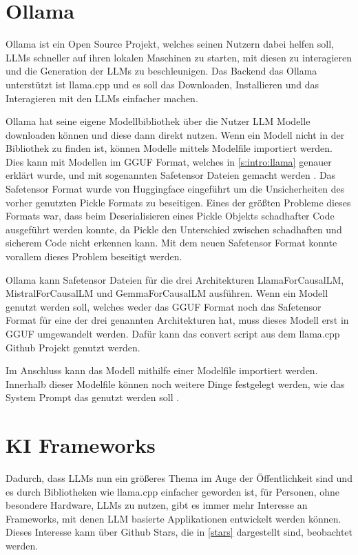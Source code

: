 \section{Ollama}
\label{s:intro:oll}
Ollama ist ein Open Source Projekt, welches seinen Nutzern dabei helfen 
soll, LLMs schneller auf ihren lokalen Maschinen 
zu starten, mit diesen zu interagieren und die Generation der LLMs zu beschleunigen. 
Das Backend das Ollama unterstützt ist llama.cpp und es soll das Downloaden, 
Installieren und das Interagieren mit den LLMs einfacher machen. \par
Ollama hat seine eigene Modellbibliothek über die Nutzer LLM Modelle 
downloaden können und diese dann direkt nutzen. 
Wenn ein Modell nicht in der Bibliothek zu finden ist, können 
Modelle mittels Modelfile importiert werden. Dies kann mit Modellen im GGUF 
Format, welches in \ref*{s:intro:llama} genauer erklärt wurde, 
 und mit sogenannten Safetensor Dateien gemacht werden \cite{OllamaOllama2024}. Das Safetensor 
Format wurde von Huggingface eingeführt um die Unsicherheiten des 
vorher genutzten Pickle Formats zu beseitigen. Eines der größten
Probleme dieses Formats war, dass beim Deserialisieren eines
Pickle Objekts schadhafter Code ausgeführt werden konnte, da 
Pickle den Unterschied zwischen schadhaften und sicherem 
Code nicht erkennen kann.\cite{Safetensors}
Mit dem neuen Safetensor Format konnte vorallem dieses Problem beseitigt werden.\par
Ollama kann Safetensor Dateien für die drei Architekturen LlamaForCausalLM, 
MistralForCausalLM und GemmaForCausalLM ausführen. Wenn ein Modell genutzt werden soll, 
welches weder  
das GGUF Format noch das Safetensor Format für eine der drei genannten Architekturen hat,
 muss dieses Modell erst in GGUF umgewandelt werden. Dafür kann das convert script
 aus dem llama.cpp Github
Projekt genutzt werden.\par
Im Anschluss kann das Modell mithilfe einer Modelfile importiert werden. 
Innerhalb dieser Modelfile können noch weitere Dinge festgelegt werden,
wie das System Prompt das genutzt werden soll \cite{OllamaOllama2024}.

\section{KI Frameworks}
\label{s:intr:frame}
Dadurch, dass LLMs nun ein größeres Thema im Auge der 
Öffentlichkeit sind und es durch Bibliotheken wie llama.cpp einfacher geworden ist, 
für Personen, ohne besondere Hardware, LLMs zu nutzen, gibt es immer mehr Interesse an
Frameworks, mit denen LLM basierte Applikationen entwickelt werden können. Dieses Interesse kann 
über Github Stars, die in \ref*{stars} dargestellt sind, beobachtet werden.\par

